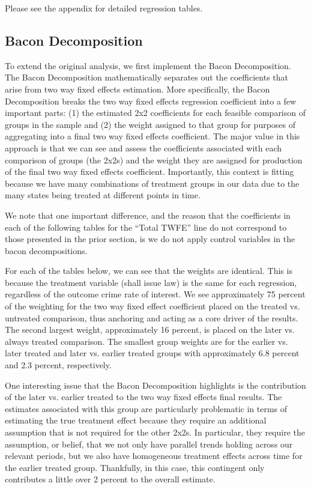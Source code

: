 \documentclass{article}
\begin{document}
Please see the appendix for detailed regression tables.

\subsection{Bacon Decomposition}

To extend the original analysis, we first implement the Bacon Decomposition. The Bacon Decomposition mathematically separates out the coefficients that arise from two way fixed effects estimation. More specifically, the Bacon Decomposition breaks the two way fixed effects regression coefficient into a few important parts: (1) the estimated 2x2 coefficients for each feasible comparison of groups in the sample and (2) the weight assigned to that group for purposes of aggregating into a final two way fixed effects coefficient. The major value in this approach is that we can see and assess the coefficients associated with each comparison of groups (the 2x2s) and the weight they are assigned for production of the final two way fixed effects coefficient. Importantly, this context is fitting because we have many combinations of treatment groups in our data due to the many states being treated at different points in time.

We note that one important difference, and the reason that the coefficients in each of the following tables for the ``Total TWFE'' line do not correspond to those presented in the prior section, is we do not apply control variables in the bacon decompositions.

For each of the tables below, we can see that the weights are identical. This is because the treatment variable (shall issue law) is the same for each regression, regardless of the outcome crime rate of interest. We see approximately 75 percent of the weighting for the two way fixed effect coefficient placed on the treated vs. untreated comparison, thus anchoring and acting as a core driver of the results. The second largest weight, approximately 16 percent, is placed on the later vs. always treated comparison. The smallest group weights are for the earlier vs. later treated and later vs. earlier treated groups with approximately 6.8 percent and 2.3 percent, respectively. 

One interesting issue that the Bacon Decomposition highlights is the contribution of the later vs. earlier treated to the two way fixed effects final results. The estimates associated with this group are particularly problematic in terms of estimating the true treatment effect because they require an additional assumption that is not required for the other 2x2s. In particular, they require the assumption, or belief, that we not only have parallel trends holding across our relevant periods, but we also have homogeneous treatment effects across time for the earlier treated group. Thankfully, in this case, this contingent only contributes a little over 2 percent to the overall estimate.
\end{document}
